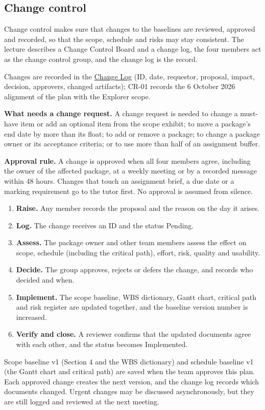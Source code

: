 \subsection{Change control}
\label{sec:changecontrol}

Change control makes sure that changes to the baselines are reviewed, approved and recorded, so that the scope, schedule and risks may stay consistent. The lecture describes a Change Control Board and a change log, the four members act as the change control group, and the change log is the record.

Changes are recorded in the \href{https://cos30039g14.atlassian.net/wiki/spaces/COS30049G1/database/8912906}{Change Log} (ID, date, requestor, proposal, impact, decision, approvers, changed artifacts); CR-01 records the 6 October 2026 alignment of the plan with the Explorer scope.

\textbf{What needs a change request.} A change request is needed to change a must-have item or add an optional item from the scope exhibit; to move a package's end date by more than its float; to add or remove a package; to change a package owner or its acceptance criteria; or to use more than half of an assignment buffer.

\textbf{Approval rule.} A change is approved when all four members agree, including the owner of the affected package, at a weekly meeting or by a recorded message within 48 hours. Changes that touch an assignment brief, a due date or a marking requirement go to the tutor first. No approval is assumed from silence.

\begin{enumerate}
  \item \textbf{Raise.} Any member records the proposal and the reason on the day it arises.
  \item \textbf{Log.} The change receives an ID and the status Pending.
  \item \textbf{Assess.} The package owner and other team members assess the effect on scope, schedule (including the critical path), effort, risk, quality and usability.
  \item \textbf{Decide.} The group approves, rejects or defers the change, and records who decided and when.
  \item \textbf{Implement.} The scope baseline, WBS dictionary, Gantt chart, critical path and risk register are updated together, and the baseline version number is increased.
  \item \textbf{Verify and close.} A reviewer confirms that the updated documents agree with each other, and the status becomes Implemented.
\end{enumerate}

Scope baseline v1 (Section 4 and the WBS dictionary) and schedule baseline v1 (the Gantt chart and critical path) are saved when the team approves this plan. Each approved change creates the next version, and the change log records which documents changed. Urgent changes may be discussed asynchronously, but they are still logged and reviewed at the next meeting.
